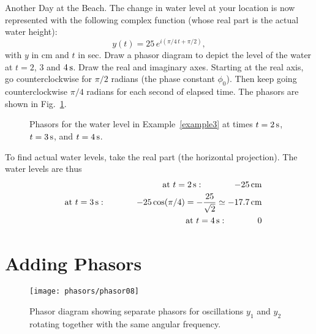 \begin{example}{Another Day at the Beach.}  
\label{example3}
The change in water level at your location is now represented with
the following complex function (whose real part is the actual water
height):
\begin{equation}
y(t) = 25 \, e^{i(\pi/4\, t + \pi/2)},
\end{equation}
with $y$ in cm and $t$ in sec. 
Draw a phasor diagram to depict the level of the water at $t = 2$, 3 and 
$4\,\mbox{s}$.
\solution
Draw the real and imaginary axes.  Starting at the real axis, 
go counterclockwise for $\pi/2$ radians (the phase constant $\phi_0$).  
Then keep going counterclockwise $\pi/4$ radians for each second of 
elapsed time.  The phasors are shown in Fig.~\ref{fig:phasorRotation}.

\begin{figure}
\begin{center}
\caption{\label{fig:phasorRotation}Phasors for the water level in 
Example~\ref{example3} at times $t=2\,\mbox{s}$, $t=3\,\mbox{s}$, and 
$t=4\,\mbox{s}$.}
\end{center}
\end{figure}
To find actual water levels, take the real part (the horizontal projection).  
The water levels are thus   
\begin{eqnarray}
&&\mbox{at $t=2\,\mbox{s}$}: \hspace{0.5in}-25\,\mbox{cm}\nonumber \\
&&\mbox{at $t=3\,\mbox{s}$}: \hspace{0.5in}-25\cos(\pi/4)= 
  -\frac{25}{\sqrt{2}}\simeq-17.7\,\mbox{cm}\nonumber\\ 
&&\mbox{at $t=4\,\mbox{s}$}:\hspace{0.5in}0\nonumber
\end{eqnarray}
\end{example}

\section{Adding Phasors}
\label{sec:adding_phasors}

\begin{figure}[b]
\begin{center}
\texttt{[image: phasors/phasor08]} 
\caption{\label{fig:phasor08}Phasor diagram showing separate phasors 
for oscillations $y_1$ and $y_2$ rotating together with the 
same angular frequency.}
\end{center}
\end{figure}
%


